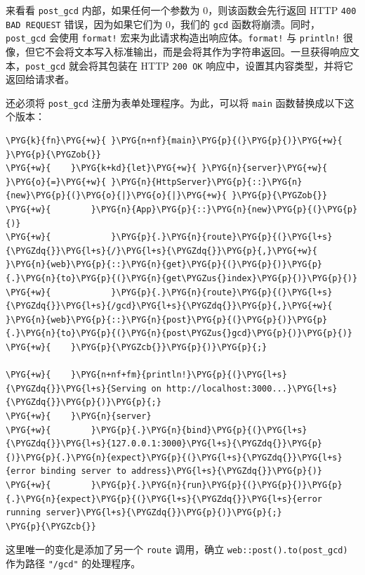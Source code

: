 来看看 \texttt{post\_gcd} 内部，如果任何一个参数为 0，则该函数会先行返回 HTTP \texttt{400 BAD REQUEST} 错误，因为如果它们为 0，我们的 \texttt{gcd} 函数将崩溃。同时，\texttt{post\_gcd} 会使用 \texttt{format!} 宏来为此请求构造出响应体。\texttt{format!} 与 \texttt{println!} 很像，但它不会将文本写入标准输出，而是会将其作为字符串返回。一旦获得响应文本，\texttt{post\_gcd} 就会将其包装在 HTTP \texttt{200 OK} 响应中，设置其内容类型，并将它返回给请求者。

还必须将 \texttt{post\_gcd} 注册为表单处理程序。为此，可以将 \texttt{main} 函数替换成以下这个版本：

\begin{Verbatim}[commandchars=\\\{\},breaklines=true,breakanywhere=true,fontsize=\codefont,xleftmargin=17bp]
\PYG{k}{fn}\PYG{+w}{ }\PYG{n+nf}{main}\PYG{p}{(}\PYG{p}{)}\PYG{+w}{ }\PYG{p}{\PYGZob{}}
\PYG{+w}{    }\PYG{k+kd}{let}\PYG{+w}{ }\PYG{n}{server}\PYG{+w}{ }\PYG{o}{=}\PYG{+w}{ }\PYG{n}{HttpServer}\PYG{p}{::}\PYG{n}{new}\PYG{p}{(}\PYG{o}{|}\PYG{o}{|}\PYG{+w}{ }\PYG{p}{\PYGZob{}}
\PYG{+w}{        }\PYG{n}{App}\PYG{p}{::}\PYG{n}{new}\PYG{p}{(}\PYG{p}{)}
\PYG{+w}{            }\PYG{p}{.}\PYG{n}{route}\PYG{p}{(}\PYG{l+s}{\PYGZdq{}}\PYG{l+s}{/}\PYG{l+s}{\PYGZdq{}}\PYG{p}{,}\PYG{+w}{ }\PYG{n}{web}\PYG{p}{::}\PYG{n}{get}\PYG{p}{(}\PYG{p}{)}\PYG{p}{.}\PYG{n}{to}\PYG{p}{(}\PYG{n}{get\PYGZus{}index}\PYG{p}{)}\PYG{p}{)}
\PYG{+w}{            }\PYG{p}{.}\PYG{n}{route}\PYG{p}{(}\PYG{l+s}{\PYGZdq{}}\PYG{l+s}{/gcd}\PYG{l+s}{\PYGZdq{}}\PYG{p}{,}\PYG{+w}{ }\PYG{n}{web}\PYG{p}{::}\PYG{n}{post}\PYG{p}{(}\PYG{p}{)}\PYG{p}{.}\PYG{n}{to}\PYG{p}{(}\PYG{n}{post\PYGZus{}gcd}\PYG{p}{)}\PYG{p}{)}
\PYG{+w}{    }\PYG{p}{\PYGZcb{}}\PYG{p}{)}\PYG{p}{;}

\PYG{+w}{    }\PYG{n+nf+fm}{println!}\PYG{p}{(}\PYG{l+s}{\PYGZdq{}}\PYG{l+s}{Serving on http://localhost:3000...}\PYG{l+s}{\PYGZdq{}}\PYG{p}{)}\PYG{p}{;}
\PYG{+w}{    }\PYG{n}{server}
\PYG{+w}{        }\PYG{p}{.}\PYG{n}{bind}\PYG{p}{(}\PYG{l+s}{\PYGZdq{}}\PYG{l+s}{127.0.0.1:3000}\PYG{l+s}{\PYGZdq{}}\PYG{p}{)}\PYG{p}{.}\PYG{n}{expect}\PYG{p}{(}\PYG{l+s}{\PYGZdq{}}\PYG{l+s}{error binding server to address}\PYG{l+s}{\PYGZdq{}}\PYG{p}{)}
\PYG{+w}{        }\PYG{p}{.}\PYG{n}{run}\PYG{p}{(}\PYG{p}{)}\PYG{p}{.}\PYG{n}{expect}\PYG{p}{(}\PYG{l+s}{\PYGZdq{}}\PYG{l+s}{error running server}\PYG{l+s}{\PYGZdq{}}\PYG{p}{)}\PYG{p}{;}
\PYG{p}{\PYGZcb{}}
\end{Verbatim}

这里唯一的变化是添加了另一个 \texttt{route} 调用，确立 \texttt{web::post().to(post\_gcd)} 作为路径 \texttt{"/gcd"} 的处理程序。

